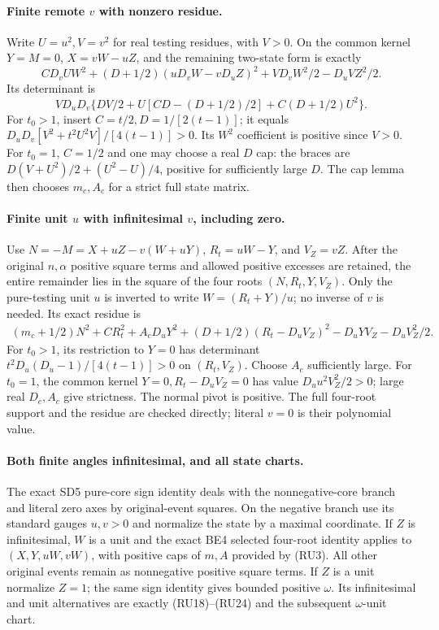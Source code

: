 \paragraph{Finite remote $v$ with nonzero residue.}
Write $U=u^2,V=v^2$ for real testing residues, with $V>0$.
On the common kernel $Y=M=0$, $X=vW-uZ$, and the remaining
two-state form is exactly
\[
 CD_vU W^2+(D+1/2)(uD_vW-vD_uZ)^2
                  +VD_vW^2/2-D_uVZ^2/2.                         \tag{RU25}
\]
Its determinant is
\[
 VD_uD_v\{DV/2+U[CD-(D+1/2)/2]+C(D+1/2)U^2\}.
 \tag{RU26}
\]
For $t_0>1$, insert $C=t/2,D=1/[2(t-1)]$; it equals
$D_uD_v[V^2+t^2U^2V]/[4(t-1)]>0$.
Its $W^2$ coefficient is positive since $V>0$.
For $t_0=1$, $C=1/2$ and one may choose a real $D$ cap: the braces
are $D(V+U^2)/2+(U^2-U)/4$, positive for sufficiently large $D$.
The cap lemma then chooses $m_c,A_c$ for a strict full state matrix.

\paragraph{Finite unit $u$ with infinitesimal $v$, including zero.}
Use $N=-M=X+uZ-v(W+uY)$, $R_t=uW-Y$, and $V_Z=vZ$.
After the original $n,\alpha$ positive square terms and allowed positive excesses
are retained, the entire remainder lies in the square of the four
roots $(N,R_t,Y,V_Z)$. Only the pure-testing unit $u$ is inverted
to write $W=(R_t+Y)/u$; no inverse of $v$ is needed. Its exact
residue is
\[
\begin{aligned}
 (m_c+1/2)N^2+CR_t^2+A_cD_uY^2
 +(D+1/2)(R_t-D_uV_Z)^2-D_uYV_Z-D_uV_Z^2/2.
\end{aligned}                                                     \tag{RU27}
\]
For $t_0>1$, its restriction to $Y=0$ has determinant
$t^2D_u(D_u-1)/[4(t-1)]>0$ on $(R_t,V_Z)$.
Choose $A_c$ sufficiently large. For $t_0=1$, the common kernel
$Y=0,R_t-D_uV_Z=0$ has value $D_uu^2V_Z^2/2>0$;
large real $D_c,A_c$ give strictness. The normal pivot is positive.
The full four-root support and the residue are checked directly;
literal $v=0$ is their polynomial value.

\paragraph{Both finite angles infinitesimal, and all state charts.}
The exact SD5 pure-core sign identity deals with the nonnegative-core
branch and literal zero axes by original-event squares. On the
negative branch use its standard gauges $u,v>0$ and normalize the
state by a maximal coordinate. If $Z$ is infinitesimal, $W$ is a
unit and the exact BE4 selected four-root identity applies to
$(X,Y,uW,vW)$, with positive caps of $m,A$ provided by (RU3).
All other original events remain as nonnegative positive square terms.
If $Z$ is a unit normalize $Z=1$; the same sign identity gives
bounded positive $\omega$. Its infinitesimal and unit alternatives
are exactly (RU18)--(RU24) and the subsequent $\omega$-unit chart.

